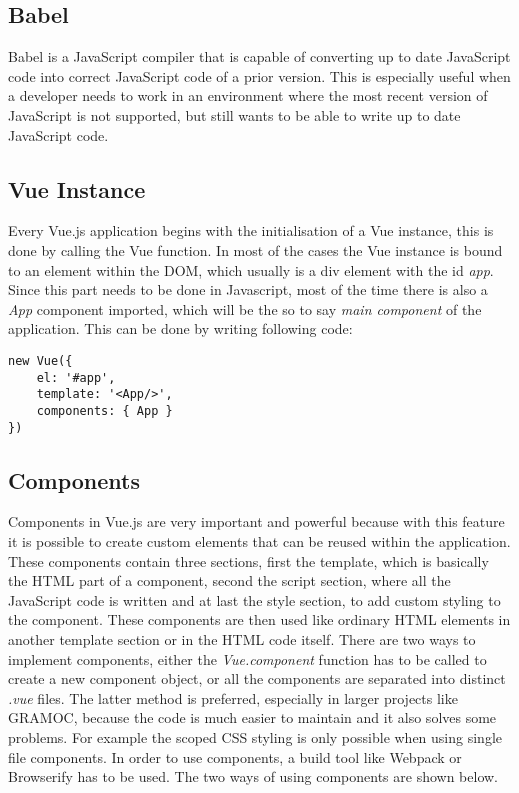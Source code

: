 \subsection{Babel}
Babel is a JavaScript compiler that is capable of converting up to date JavaScript code into correct JavaScript code of a prior version. This is especially useful when a developer needs to work in an environment where the most recent version of JavaScript is not supported, but still wants to be able to write up to date JavaScript code.

\subsection{Vue Instance}
Every Vue.js application begins with the initialisation of a Vue instance, this is done by calling the {Vue} function. In most of the cases the Vue instance is bound to an element within the DOM, which usually is a div element with the id \textit{app}. Since this part needs to be done in Javascript, most of the time there is also a \textit{App} component imported, which will be the so to say \textit{main component} of the application. This can be done by writing following code:

\begin{minipage}{\linewidth}
\begin{lstlisting}[caption={Creating a Vue instance}, label=lst:vue-instance, captionpos=b, style=htmlcssjs]
new Vue({
    el: '#app',
    template: '<App/>',
    components: { App }
})
\end{lstlisting}
\end{minipage}

\subsection{Components}
Components in Vue.js are very important and powerful because with this feature it is possible to create custom elements that can be reused within the application. These components contain three sections, first the template, which is basically the HTML part of a component, second the script section, where all the JavaScript code is written and at last the style section, to add custom styling to the component. These components are then used like ordinary HTML elements in another template section or in the HTML code itself. There are two ways to implement components, either the \textit{Vue.component} function has to be called to create a new component object, or all the components are separated into distinct \textit{.vue} files. The latter method is preferred, especially in larger projects like GRAMOC, because the code is much easier to maintain and it also solves some problems. For example the scoped CSS styling is only possible when using single file components. In order to use components, a build tool like Webpack or Browserify has to be used. The two ways of using components are shown below.

